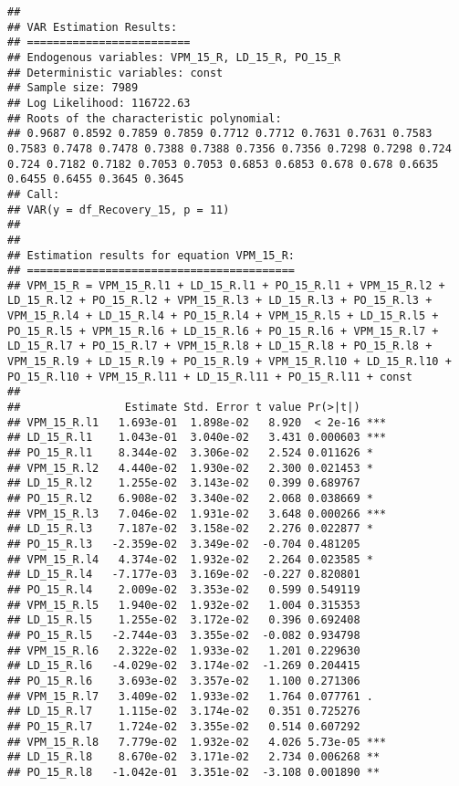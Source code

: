 \documentclass[
]{article}
\begin{document}
\begin{verbatim}
## 
## VAR Estimation Results:
## ========================= 
## Endogenous variables: VPM_15_R, LD_15_R, PO_15_R 
## Deterministic variables: const 
## Sample size: 7989 
## Log Likelihood: 116722.63 
## Roots of the characteristic polynomial:
## 0.9687 0.8592 0.7859 0.7859 0.7712 0.7712 0.7631 0.7631 0.7583 0.7583 0.7478 0.7478 0.7388 0.7388 0.7356 0.7356 0.7298 0.7298 0.724 0.724 0.7182 0.7182 0.7053 0.7053 0.6853 0.6853 0.678 0.678 0.6635 0.6455 0.6455 0.3645 0.3645
## Call:
## VAR(y = df_Recovery_15, p = 11)
## 
## 
## Estimation results for equation VPM_15_R: 
## ========================================= 
## VPM_15_R = VPM_15_R.l1 + LD_15_R.l1 + PO_15_R.l1 + VPM_15_R.l2 + LD_15_R.l2 + PO_15_R.l2 + VPM_15_R.l3 + LD_15_R.l3 + PO_15_R.l3 + VPM_15_R.l4 + LD_15_R.l4 + PO_15_R.l4 + VPM_15_R.l5 + LD_15_R.l5 + PO_15_R.l5 + VPM_15_R.l6 + LD_15_R.l6 + PO_15_R.l6 + VPM_15_R.l7 + LD_15_R.l7 + PO_15_R.l7 + VPM_15_R.l8 + LD_15_R.l8 + PO_15_R.l8 + VPM_15_R.l9 + LD_15_R.l9 + PO_15_R.l9 + VPM_15_R.l10 + LD_15_R.l10 + PO_15_R.l10 + VPM_15_R.l11 + LD_15_R.l11 + PO_15_R.l11 + const 
## 
##                Estimate Std. Error t value Pr(>|t|)    
## VPM_15_R.l1   1.693e-01  1.898e-02   8.920  < 2e-16 ***
## LD_15_R.l1    1.043e-01  3.040e-02   3.431 0.000603 ***
## PO_15_R.l1    8.344e-02  3.306e-02   2.524 0.011626 *  
## VPM_15_R.l2   4.440e-02  1.930e-02   2.300 0.021453 *  
## LD_15_R.l2    1.255e-02  3.143e-02   0.399 0.689767    
## PO_15_R.l2    6.908e-02  3.340e-02   2.068 0.038669 *  
## VPM_15_R.l3   7.046e-02  1.931e-02   3.648 0.000266 ***
## LD_15_R.l3    7.187e-02  3.158e-02   2.276 0.022877 *  
## PO_15_R.l3   -2.359e-02  3.349e-02  -0.704 0.481205    
## VPM_15_R.l4   4.374e-02  1.932e-02   2.264 0.023585 *  
## LD_15_R.l4   -7.177e-03  3.169e-02  -0.227 0.820801    
## PO_15_R.l4    2.009e-02  3.353e-02   0.599 0.549119    
## VPM_15_R.l5   1.940e-02  1.932e-02   1.004 0.315353    
## LD_15_R.l5    1.255e-02  3.172e-02   0.396 0.692408    
## PO_15_R.l5   -2.744e-03  3.355e-02  -0.082 0.934798    
## VPM_15_R.l6   2.322e-02  1.933e-02   1.201 0.229630    
## LD_15_R.l6   -4.029e-02  3.174e-02  -1.269 0.204415    
## PO_15_R.l6    3.693e-02  3.357e-02   1.100 0.271306    
## VPM_15_R.l7   3.409e-02  1.933e-02   1.764 0.077761 .  
## LD_15_R.l7    1.115e-02  3.174e-02   0.351 0.725276    
## PO_15_R.l7    1.724e-02  3.355e-02   0.514 0.607292    
## VPM_15_R.l8   7.779e-02  1.932e-02   4.026 5.73e-05 ***
## LD_15_R.l8    8.670e-02  3.171e-02   2.734 0.006268 ** 
## PO_15_R.l8   -1.042e-01  3.351e-02  -3.108 0.001890 ** 

\end{verbatim}
\end{document}
